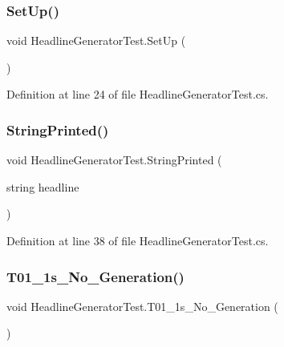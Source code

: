 \subsubsection{\texorpdfstring{Set\+Up()}{SetUp()}}
{\footnotesize\ttfamily void Headline\+Generator\+Test.\+Set\+Up (\begin{DoxyParamCaption}{ }\end{DoxyParamCaption})}



Definition at line 24 of file Headline\+Generator\+Test.\+cs.

\mbox{\label{class_headline_generator_test_ad24bb9e052df951b99154205d87739b6}} 
\subsubsection{\texorpdfstring{String\+Printed()}{StringPrinted()}}
{\footnotesize\ttfamily void Headline\+Generator\+Test.\+String\+Printed (\begin{DoxyParamCaption}\item[{string}]{headline }\end{DoxyParamCaption})}



Definition at line 38 of file Headline\+Generator\+Test.\+cs.

\mbox{\label{class_headline_generator_test_aeb66376e068bbe5f7f4d6b5fac538621}} 
\subsubsection{\texorpdfstring{T01\+\_\+1s\+\_\+\+No\+\_\+\+Generation()}{T01\_1s\_No\_Generation()}}
{\footnotesize\ttfamily void Headline\+Generator\+Test.\+T01\+\_\+1s\+\_\+\+No\+\_\+\+Generation (\begin{DoxyParamCaption}{ }\end{DoxyParamCaption})}




